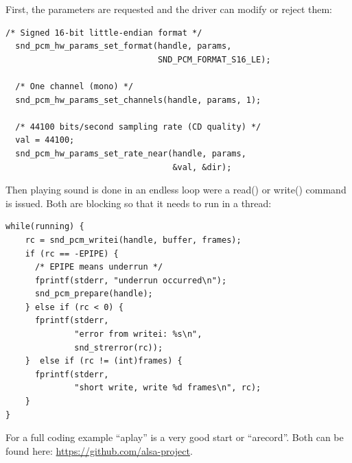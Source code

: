\documentclass[12pt]{report}
\begin{document}
First, the parameters are requested and the driver can modify or
reject them:
\begin{verbatim}
/* Signed 16-bit little-endian format */
  snd_pcm_hw_params_set_format(handle, params,
                               SND_PCM_FORMAT_S16_LE);

  /* One channel (mono) */
  snd_pcm_hw_params_set_channels(handle, params, 1);

  /* 44100 bits/second sampling rate (CD quality) */
  val = 44100;
  snd_pcm_hw_params_set_rate_near(handle, params,
                                  &val, &dir);
\end{verbatim}

Then playing sound is done in an endless loop were a read()
or write() command is issued. Both are blocking so that
it needs to run in a thread:

\begin{verbatim}
while(running) {
    rc = snd_pcm_writei(handle, buffer, frames);
    if (rc == -EPIPE) {
      /* EPIPE means underrun */
      fprintf(stderr, "underrun occurred\n");
      snd_pcm_prepare(handle);
    } else if (rc < 0) {
      fprintf(stderr,
              "error from writei: %s\n",
              snd_strerror(rc));
    }  else if (rc != (int)frames) {
      fprintf(stderr,
              "short write, write %d frames\n", rc);
    }
}
\end{verbatim}

For a full coding example ``aplay'' is a very
good start or ``arecord''. Both can be found here:
\url{https://github.com/alsa-project}.
\end{document}

